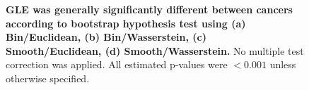 \begin{figure}[ht!]
    \caption{\textbf{GLE was generally significantly different between cancers according to bootstrap hypothesis test using (a) Bin/Euclidean, (b) Bin/Wasserstein, (c) Smooth/Euclidean, (d) Smooth/Wasserstein.} No multiple test correction was applied. All estimated p-values were $<0.001$ unless otherwise specified.}
    \label{fig:bootstrap}
\end{figure}
